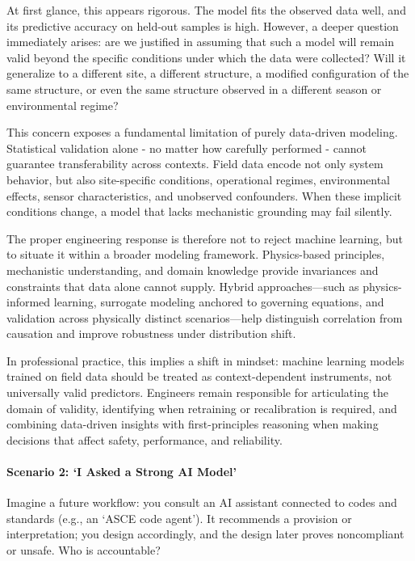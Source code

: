 \documentclass[12pt]{article}
\begin{document}
At first glance, this appears rigorous. The model fits the observed data well, and its predictive accuracy on held-out samples is high. However, a deeper question immediately arises: are we justified in assuming that such a model will remain valid beyond the specific conditions under which the data were collected? Will it generalize to a different site, a different structure, a modified configuration of the same structure, or even the same structure observed in a different season or environmental regime?

This concern exposes a fundamental limitation of purely data-driven modeling. Statistical validation alone - no matter how carefully performed - cannot guarantee transferability across contexts. Field data encode not only system behavior, but also site-specific conditions, operational regimes, environmental effects, sensor characteristics, and unobserved confounders. When these implicit conditions change, a model that lacks mechanistic grounding may fail silently.

The proper engineering response is therefore not to reject machine learning, but to situate it within a broader modeling framework. Physics-based principles, mechanistic understanding, and domain knowledge provide invariances and constraints that data alone cannot supply. Hybrid approaches—such as physics-informed learning, surrogate modeling anchored to governing equations, and validation across physically distinct scenarios—help distinguish correlation from causation and improve robustness under distribution shift.

In professional practice, this implies a shift in mindset: machine learning models trained on field data should be treated as context-dependent instruments, not universally valid predictors. Engineers remain responsible for articulating the domain of validity, identifying when retraining or recalibration is required, and combining data-driven insights with first-principles reasoning when making decisions that affect safety, performance, and reliability.


\paragraph{Scenario 2: `I Asked a Strong AI Model'}
Imagine a future workflow: you consult an AI assistant connected to codes and standards (e.g., an `ASCE code agent'). It recommends a provision or interpretation; you design accordingly, and the design later proves noncompliant or unsafe. Who is accountable?
\end{document}
